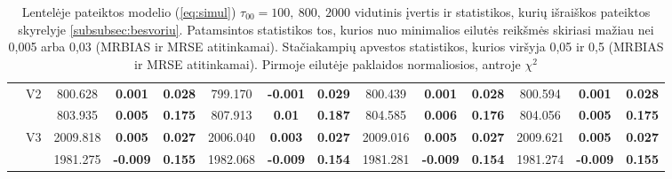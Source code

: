 \documentclass[12pt,a4paper]{article}
\begin{document}
\begin{sidewaystable}[H]
{\begin{tabular}{cc|ccc|ccc|ccc|ccc|}
   & \multirow{2}{*}{V2} & 800.628 & \textbf{0.001} & \textbf{0.028} & 799.170 & \textbf{-0.001} & \textbf{0.029} & 800.439 & \textbf{0.001} & \textbf{0.028} & 800.594 & \textbf{0.001} & \textbf{0.028} \\ 
   &  & 803.935 & \textbf{0.005} & \textbf{0.175} & 807.913 & \textbf{0.01} & \textbf{0.187} & 804.585 & \textbf{0.006} & \textbf{0.176} & 804.056 & \textbf{0.005} & \textbf{0.175} \\ 
   & \multirow{2}{*}{V3} & 2009.818 & \textbf{0.005} & \textbf{0.027} & 2006.040 & \textbf{0.003} & \textbf{0.027} & 2009.016 & \textbf{0.005} & \textbf{0.027} & 2009.621 & \textbf{0.005} & \textbf{0.027} \\ 
   &  & 1981.275 & \textbf{-0.009} & \textbf{0.155} & 1982.068 & \textbf{-0.009} & \textbf{0.154} & 1981.281 & \textbf{-0.009} & \textbf{0.154} & 1981.274 & \textbf{-0.009} & \textbf{0.155} \\ 
   \hline
\end{tabular}
}
\caption{Lentelėje pateiktos modelio (\ref{eq:simul}) $\tau_{00}=100,\ 800,\ 2000$ vidutinis įvertis ir statistikos, kurių išraiškos pateiktos skyrelyje \ref{subsubsec:besvoriu}. Patamsintos statistikos tos, kurios nuo minimalios eilutės reikšmės skiriasi mažiau nei 0,005 arba 0,03 (MRBIAS ir MRSE atitinkamai). Stačiakampių apvestos statistikos, kurios viršyja 0,05 ir 0,5 (MRBIAS ir MRSE atitinkamai). Pirmoje eilutėje paklaidos normaliosios, antroje $\chi^2$}
\end{sidewaystable}
\end{document}
